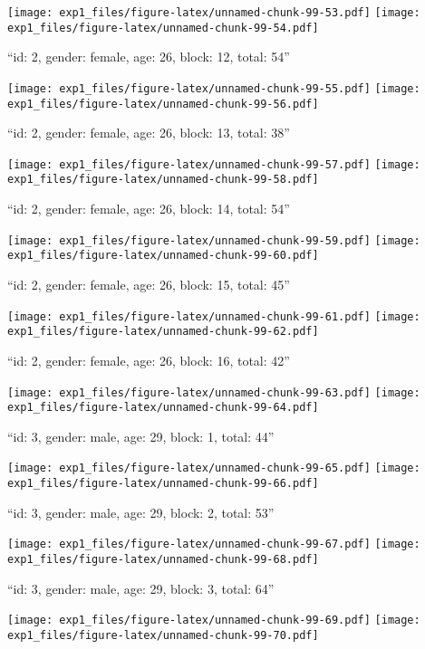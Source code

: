 \documentclass[,]{article}
\begin{document}
\texttt{[image: exp1\_files/figure-latex/unnamed-chunk-99-53.pdf]}
\texttt{[image: exp1\_files/figure-latex/unnamed-chunk-99-54.pdf]}

\newpage
[1] 

``id: 2, gender: female, age: 26, block: 12, total: 54''

\texttt{[image: exp1\_files/figure-latex/unnamed-chunk-99-55.pdf]}
\texttt{[image: exp1\_files/figure-latex/unnamed-chunk-99-56.pdf]}

\newpage
[1] 

``id: 2, gender: female, age: 26, block: 13, total: 38''

\texttt{[image: exp1\_files/figure-latex/unnamed-chunk-99-57.pdf]}
\texttt{[image: exp1\_files/figure-latex/unnamed-chunk-99-58.pdf]}

\newpage
[1] 

``id: 2, gender: female, age: 26, block: 14, total: 54''

\texttt{[image: exp1\_files/figure-latex/unnamed-chunk-99-59.pdf]}
\texttt{[image: exp1\_files/figure-latex/unnamed-chunk-99-60.pdf]}

\newpage
[1] 

``id: 2, gender: female, age: 26, block: 15, total: 45''

\texttt{[image: exp1\_files/figure-latex/unnamed-chunk-99-61.pdf]}
\texttt{[image: exp1\_files/figure-latex/unnamed-chunk-99-62.pdf]}

\newpage
[1] 

``id: 2, gender: female, age: 26, block: 16, total: 42''

\texttt{[image: exp1\_files/figure-latex/unnamed-chunk-99-63.pdf]}
\texttt{[image: exp1\_files/figure-latex/unnamed-chunk-99-64.pdf]}

\newpage
[1] 

``id: 3, gender: male, age: 29, block: 1, total: 44''

\texttt{[image: exp1\_files/figure-latex/unnamed-chunk-99-65.pdf]}
\texttt{[image: exp1\_files/figure-latex/unnamed-chunk-99-66.pdf]}

\newpage
[1] 

``id: 3, gender: male, age: 29, block: 2, total: 53''

\texttt{[image: exp1\_files/figure-latex/unnamed-chunk-99-67.pdf]}
\texttt{[image: exp1\_files/figure-latex/unnamed-chunk-99-68.pdf]}

\newpage
[1] 

``id: 3, gender: male, age: 29, block: 3, total: 64''

\texttt{[image: exp1\_files/figure-latex/unnamed-chunk-99-69.pdf]}
\texttt{[image: exp1\_files/figure-latex/unnamed-chunk-99-70.pdf]}
\end{document}
